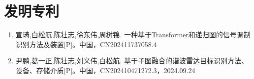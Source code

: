 {    \section{发明专利}
    \begin{enumerate}
        \item	宣琦,白松航,陈壮志,徐东伟,周树锦. 一种基于Transformer和递归图的信号调制识别方法及装置[P]。中国，CN202411737058.4
        \item	尹鹏,葛一正,陈壮志,刘义伟,白松航. 基于子图融合的谐波雷达目标识别方法、设备、存储介质[P]。中国，CN202410471272.3，2024.09.24
    \end{enumerate}
}


